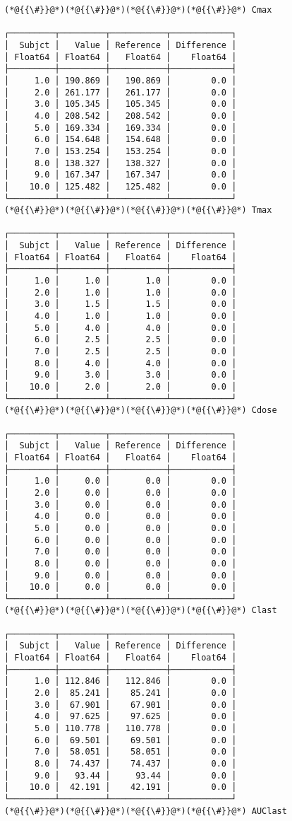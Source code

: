 \documentclass[12pt,a4paper]{article}
\begin{document}
\begin{lstlisting}
(*@{{\#}}@*)(*@{{\#}}@*)(*@{{\#}}@*)(*@{{\#}}@*) Cmax

┌─────────┬─────────┬───────────┬────────────┐
│  Subjct │   Value │ Reference │ Difference │
│ Float64 │ Float64 │   Float64 │    Float64 │
├─────────┼─────────┼───────────┼────────────┤
│     1.0 │ 190.869 │   190.869 │        0.0 │
│     2.0 │ 261.177 │   261.177 │        0.0 │
│     3.0 │ 105.345 │   105.345 │        0.0 │
│     4.0 │ 208.542 │   208.542 │        0.0 │
│     5.0 │ 169.334 │   169.334 │        0.0 │
│     6.0 │ 154.648 │   154.648 │        0.0 │
│     7.0 │ 153.254 │   153.254 │        0.0 │
│     8.0 │ 138.327 │   138.327 │        0.0 │
│     9.0 │ 167.347 │   167.347 │        0.0 │
│    10.0 │ 125.482 │   125.482 │        0.0 │
└─────────┴─────────┴───────────┴────────────┘
(*@{{\#}}@*)(*@{{\#}}@*)(*@{{\#}}@*)(*@{{\#}}@*) Tmax

┌─────────┬─────────┬───────────┬────────────┐
│  Subjct │   Value │ Reference │ Difference │
│ Float64 │ Float64 │   Float64 │    Float64 │
├─────────┼─────────┼───────────┼────────────┤
│     1.0 │     1.0 │       1.0 │        0.0 │
│     2.0 │     1.0 │       1.0 │        0.0 │
│     3.0 │     1.5 │       1.5 │        0.0 │
│     4.0 │     1.0 │       1.0 │        0.0 │
│     5.0 │     4.0 │       4.0 │        0.0 │
│     6.0 │     2.5 │       2.5 │        0.0 │
│     7.0 │     2.5 │       2.5 │        0.0 │
│     8.0 │     4.0 │       4.0 │        0.0 │
│     9.0 │     3.0 │       3.0 │        0.0 │
│    10.0 │     2.0 │       2.0 │        0.0 │
└─────────┴─────────┴───────────┴────────────┘
(*@{{\#}}@*)(*@{{\#}}@*)(*@{{\#}}@*)(*@{{\#}}@*) Cdose

┌─────────┬─────────┬───────────┬────────────┐
│  Subjct │   Value │ Reference │ Difference │
│ Float64 │ Float64 │   Float64 │    Float64 │
├─────────┼─────────┼───────────┼────────────┤
│     1.0 │     0.0 │       0.0 │        0.0 │
│     2.0 │     0.0 │       0.0 │        0.0 │
│     3.0 │     0.0 │       0.0 │        0.0 │
│     4.0 │     0.0 │       0.0 │        0.0 │
│     5.0 │     0.0 │       0.0 │        0.0 │
│     6.0 │     0.0 │       0.0 │        0.0 │
│     7.0 │     0.0 │       0.0 │        0.0 │
│     8.0 │     0.0 │       0.0 │        0.0 │
│     9.0 │     0.0 │       0.0 │        0.0 │
│    10.0 │     0.0 │       0.0 │        0.0 │
└─────────┴─────────┴───────────┴────────────┘
(*@{{\#}}@*)(*@{{\#}}@*)(*@{{\#}}@*)(*@{{\#}}@*) Clast

┌─────────┬─────────┬───────────┬────────────┐
│  Subjct │   Value │ Reference │ Difference │
│ Float64 │ Float64 │   Float64 │    Float64 │
├─────────┼─────────┼───────────┼────────────┤
│     1.0 │ 112.846 │   112.846 │        0.0 │
│     2.0 │  85.241 │    85.241 │        0.0 │
│     3.0 │  67.901 │    67.901 │        0.0 │
│     4.0 │  97.625 │    97.625 │        0.0 │
│     5.0 │ 110.778 │   110.778 │        0.0 │
│     6.0 │  69.501 │    69.501 │        0.0 │
│     7.0 │  58.051 │    58.051 │        0.0 │
│     8.0 │  74.437 │    74.437 │        0.0 │
│     9.0 │   93.44 │     93.44 │        0.0 │
│    10.0 │  42.191 │    42.191 │        0.0 │
└─────────┴─────────┴───────────┴────────────┘
(*@{{\#}}@*)(*@{{\#}}@*)(*@{{\#}}@*)(*@{{\#}}@*) AUClast


\end{lstlisting}
\end{document}
